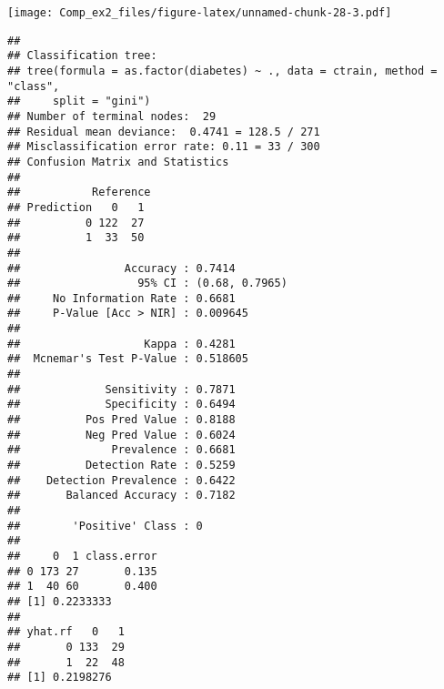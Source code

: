\documentclass[]{article}
\newenvironment{Shaded}{\begin{snugshade}}{\end{snugshade}}
\newcommand{\KeywordTok}[1]{\textcolor[rgb]{0.13,0.29,0.53}{\textbf{#1}}}
\newcommand{\DataTypeTok}[1]{\textcolor[rgb]{0.13,0.29,0.53}{#1}}
\newcommand{\DecValTok}[1]{\textcolor[rgb]{0.00,0.00,0.81}{#1}}
\newcommand{\FloatTok}[1]{\textcolor[rgb]{0.00,0.00,0.81}{#1}}
\newcommand{\StringTok}[1]{\textcolor[rgb]{0.31,0.60,0.02}{#1}}
\newcommand{\OperatorTok}[1]{\textcolor[rgb]{0.81,0.36,0.00}{\textbf{#1}}}
\newcommand{\NormalTok}[1]{#1}
\begin{document}
\begin{Shaded}
\end{Shaded}

\texttt{[image: Comp\_ex2\_files/figure-latex/unnamed-chunk-28-3.pdf]}

\begin{Shaded}
\end{Shaded}

\begin{verbatim}
## 
## Classification tree:
## tree(formula = as.factor(diabetes) ~ ., data = ctrain, method = "class", 
##     split = "gini")
## Number of terminal nodes:  29 
## Residual mean deviance:  0.4741 = 128.5 / 271 
## Misclassification error rate: 0.11 = 33 / 300 
## Confusion Matrix and Statistics
## 
##           Reference
## Prediction   0   1
##          0 122  27
##          1  33  50
##                                         
##                Accuracy : 0.7414        
##                  95% CI : (0.68, 0.7965)
##     No Information Rate : 0.6681        
##     P-Value [Acc > NIR] : 0.009645      
##                                         
##                   Kappa : 0.4281        
##  Mcnemar's Test P-Value : 0.518605      
##                                         
##             Sensitivity : 0.7871        
##             Specificity : 0.6494        
##          Pos Pred Value : 0.8188        
##          Neg Pred Value : 0.6024        
##              Prevalence : 0.6681        
##          Detection Rate : 0.5259        
##    Detection Prevalence : 0.6422        
##       Balanced Accuracy : 0.7182        
##                                         
##        'Positive' Class : 0             
##                                         
##     0  1 class.error
## 0 173 27       0.135
## 1  40 60       0.400
## [1] 0.2233333
##        
## yhat.rf   0   1
##       0 133  29
##       1  22  48
## [1] 0.2198276
\end{verbatim}
\end{document}
